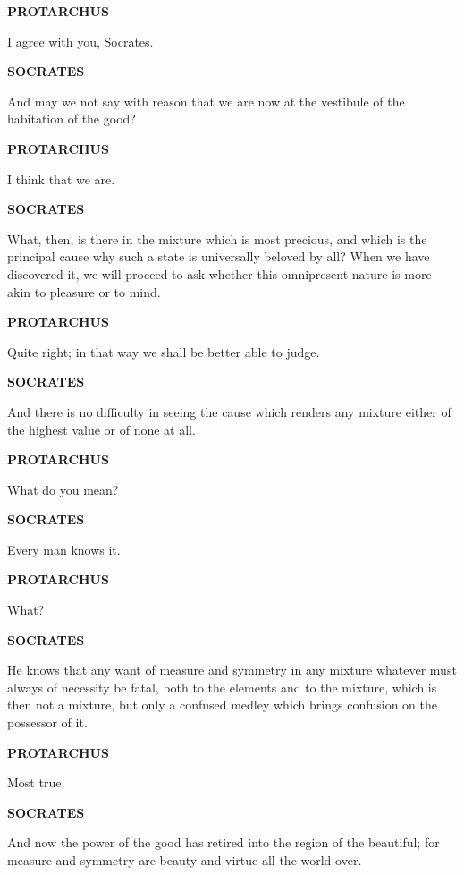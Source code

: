 \documentclass[11pt,letter]{article}
\begin{document}
\par \textbf{PROTARCHUS}
\par   I agree with you, Socrates.

\par \textbf{SOCRATES}
\par   And may we not say with reason that we are now at the vestibule of the habitation of the good?

\par \textbf{PROTARCHUS}
\par   I think that we are.

\par \textbf{SOCRATES}
\par   What, then, is there in the mixture which is most precious, and which is the principal cause why such a state is universally beloved by all? When we have discovered it, we will proceed to ask whether this omnipresent nature is more akin to pleasure or to mind.

\par \textbf{PROTARCHUS}
\par   Quite right; in that way we shall be better able to judge.

\par \textbf{SOCRATES}
\par   And there is no difficulty in seeing the cause which renders any mixture either of the highest value or of none at all.

\par \textbf{PROTARCHUS}
\par   What do you mean?

\par \textbf{SOCRATES}
\par   Every man knows it.

\par \textbf{PROTARCHUS}
\par   What?

\par \textbf{SOCRATES}
\par   He knows that any want of measure and symmetry in any mixture whatever must always of necessity be fatal, both to the elements and to the mixture, which is then not a mixture, but only a confused medley which brings confusion on the possessor of it.

\par \textbf{PROTARCHUS}
\par   Most true.

\par \textbf{SOCRATES}
\par   And now the power of the good has retired into the region of the beautiful; for measure and symmetry are beauty and virtue all the world over.
\end{document}
